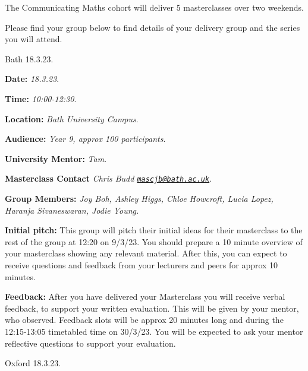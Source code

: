 \documentclass[
]{book}
\newenvironment{information}{
  \definecolor{shadecolor}{rgb}{0.8, 0.9,1.0}
  \definecolor{text-colour}{rgb}{0, 0.25, 0.52}
  \color{text-colour}
  \begin{shaded}}
 {\end{shaded}}
\begin{document}
The Communicating Maths cohort will deliver 5 masterclasses over two weekends.

Please find your group below to find details of your delivery group and the series you will attend.

Bath 18.3.23.

\begin{information}
\textbf{Date:} \emph{18.3.23}.

\textbf{Time:} \emph{10:00-12:30}.

\textbf{Location:} \emph{Bath University Campus}.

\textbf{Audience:} \emph{Year 9, approx 100 participants}.

\textbf{University Mentor:} \emph{Tam}.

\textbf{Masterclass Contact} \emph{Chris Budd \href{mailto:mascjb@bath.ac.uk}{\nolinkurl{mascjb@bath.ac.uk}}}.

\textbf{Group Members:} \emph{Joy Boh, Ashley Higgs, Chloe Howcroft, Lucia Lopez, Haranja Sivaneswaran, Jodie Young.}

\textbf{Initial pitch:} This group will pitch their initial ideas for their masterclass to the rest of the group at 12:20 on 9/3/23. You should prepare a 10 minute overview of your masterclass showing any relevant material. After this, you can expect to receive questions and feedback from your lecturers and peers for approx 10 minutes.

\textbf{Feedback:} After you have delivered your Masterclass you will receive verbal feedback, to support your written evaluation. This will be given by your mentor, who observed. Feedback slots will be approx 20 minutes long and during the 12:15-13:05 timetabled time on 30/3/23. You will be expected to ask your mentor reflective questions to support your evaluation.

\end{information}

Oxford 18.3.23.
\end{document}
